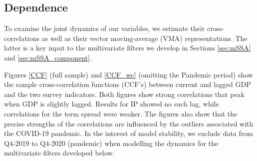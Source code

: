 \documentclass[11pt,a4paper]{article}
\begin{document}

\subsection{Dependence}
To examine the joint dynamics of our variables, we estimate their cross-correlations as well as their vector moving-average (VMA) representations. The latter is a key input to the multivariate filters we develop in Sections \eqref{sec:mSSA} and \eqref{sec:mSSA_component}. 

Figures \eqref{CCF} (full sample) and \eqref{CCF_wc} (omitting the Pandemic period) show the sample cross-correlation functions (CCF's) between current and lagged GDP and the two survey indicators. Both figures show strong correlations that peak when GDP is slightly lagged. Results for IP showed no such lag, while correlations for the term spread were weaker. The figures also show that the precise strengths of the correlations are influenced by the outliers associated with the COVID-19 pandemic. In the interest of model stability, we exclude data from Q4-2019 to Q4-2020 (pandemic) when modelling the dynamics for the multivariate filters developed below. 
\end{document}
